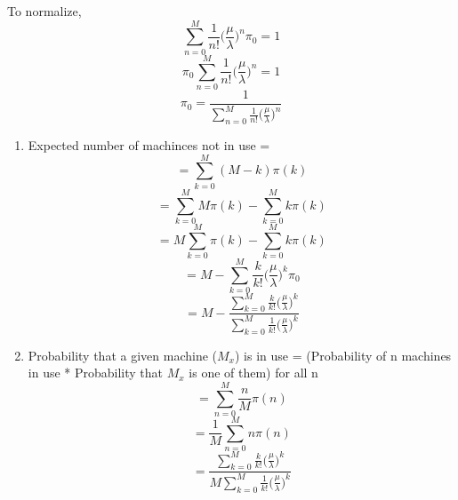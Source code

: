\documentclass[a4paper,11pt]{article}
\begin{document}
\begin{enumerate}
To normalize,
\[\sum_{n=0}^{M} \frac{1}{n!} \bigg(\frac{\mu}{\lambda}\bigg)^n \pi_0= 1 \]
\[\pi_0 \sum_{n=0}^{M} \frac{1}{n!} \bigg(\frac{\mu}{\lambda}\bigg)^n = 1 \]
\[ \pi_0= \frac{1}{\sum_{n=0}^{M} \frac{1}{n!} \big(\frac{\mu}{\lambda}\big)^n}\]
\begin{enumerate}
\item
Expected number of machinces not in use = 
\[= \sum_{k=0}^M (M-k) \pi(k)\]
\[= \sum_{k=0}^M M \pi(k) -\sum_{k=0}^M k \pi(k) \] 
\[= M\sum_{k=0}^M \pi(k) -\sum_{k=0}^M k \pi(k) \] 
\[= M -\sum_{k=0}^M \frac{k}{k!}  \bigg(\frac{\mu}{\lambda}\bigg)^k \pi_0\] 
\[= M -\frac{\sum_{k=0}^M \frac{k}{k!}  \big(\frac{\mu}{\lambda}\big)^k }{\sum_{k=0}^{M} \frac{1}{k!} \big(\frac{\mu}{\lambda}\big)^k}\] 
\item 
Probability that a given machine ($M_x$) is in use = (Probability of n machines in use * Probability that $M_x$ is one of them) for all n
\[ = \sum_{n=0}^{M} \frac{n}{M}\pi(n)\]
\[ = \frac{1}{M} \sum_{n=0}^{M} n \pi(n)\]
\[= \frac{\sum_{k=0}^M \frac{k}{k!}  \big(\frac{\mu}{\lambda}\big)^k }{M\sum_{k=0}^{M} \frac{1}{k!} \big(\frac{\mu}{\lambda}\big)^k}\] 
\end{enumerate} 


\end{enumerate}   
\end{document}
